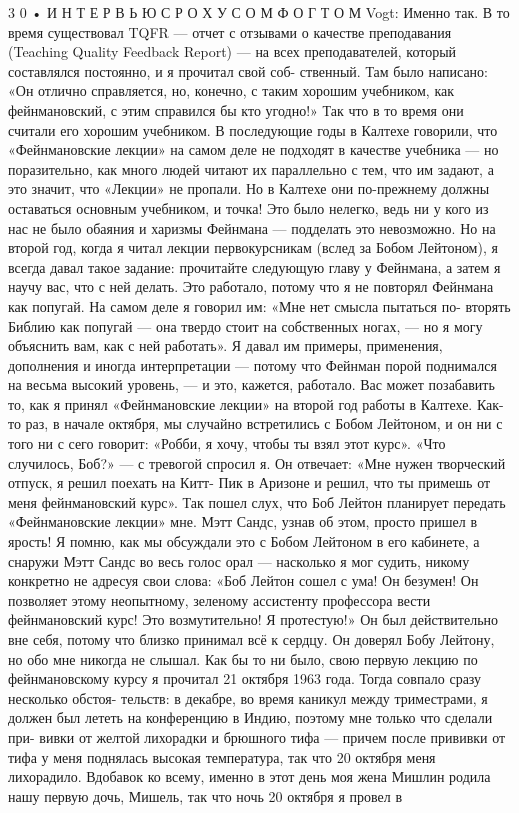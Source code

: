 \documentclass[10pt,oneside]{article}
\begin{document}
3 0 • И Н Т Е Р В Ь Ю  С  Р О Х У С О М  Ф О Г Т О М Vogt: Именно так. В то время существовал TQFR --- отчет с отзывами о качестве преподавания (Teaching Quality Feedback Report) --- на всех преподавателей, который составлялся постоянно, и я прочитал свой соб- ственный. Там было написано: «Он отлично справляется, но, конечно, с таким хорошим учебником, как фейнмановский, с этим справился бы кто угодно!» Так что в то время они считали его хорошим учебником. В последующие годы в Калтехе говорили, что «Фейнмановские лекции» на самом деле не подходят в качестве учебника --- но поразительно, как много людей читают их параллельно с тем, что им задают, а это значит, что «Лекции» не пропали. Но в Калтехе они по-прежнему должны оставаться основным учебником, и точка! Это было нелегко, ведь ни у кого из нас не было обаяния и харизмы Фейнмана --- подделать это невозможно. Но на второй год, когда я читал лекции первокурсникам (вслед за Бобом Лейтоном), я всегда давал такое задание: прочитайте следующую главу у Фейнмана, а затем я научу вас, что с ней делать. Это работало, потому что я не повторял Фейнмана как попугай. На самом деле я говорил им: «Мне нет смысла пытаться по- вторять Библию как попугай --- она твердо стоит на собственных ногах, --- но я могу объяснить вам, как с ней работать». Я давал им примеры, применения, дополнения и иногда интерпретации --- потому что Фейнман порой поднимался на весьма высокий уровень, --- и это, кажется, работало. Вас может позабавить то, как я принял «Фейнмановские лекции» на второй год работы в Калтехе. Как-то раз, в начале октября, мы случайно встретились с Бобом Лейтоном, и он ни с того ни с сего говорит: «Робби, я хочу, чтобы ты взял этот курс». «Что случилось, Боб?» --- с тревогой спросил я. Он отвечает: «Мне нужен творческий отпуск, я решил поехать на Китт- Пик в Аризоне и решил, что ты примешь от меня фейнмановский курс». Так пошел слух, что Боб Лейтон планирует передать «Фейнмановские лекции» мне. Мэтт Сандс, узнав об этом, просто пришел в ярость! Я помню, как мы обсуждали это с Бобом Лейтоном в его кабинете, а снаружи Мэтт Сандс во весь голос орал --- насколько я мог судить, никому конкретно не адресуя свои слова: «Боб Лейтон сошел с ума! Он безумен! Он позволяет этому неопытному, зеленому ассистенту профессора вести фейнмановский курс! Это возмутительно! Я протестую!» Он был действительно вне себя, потому что близко принимал всё к сердцу. Он доверял Бобу Лейтону, но обо мне никогда не слышал. Как бы то ни было, свою первую лекцию по фейнмановскому курсу я прочитал 21 октября 1963 года. Тогда совпало сразу несколько обстоя- тельств: в декабре, во время каникул между триместрами, я должен был лететь на конференцию в Индию, поэтому мне только что сделали при- вивки от желтой лихорадки и брюшного тифа --- причем после прививки от тифа у меня поднялась высокая температура, так что 20 октября меня лихорадило. Вдобавок ко всему, именно в этот день моя жена Мишлин родила нашу первую дочь, Мишель, так что ночь 20 октября я провел в\par
\end{document}
